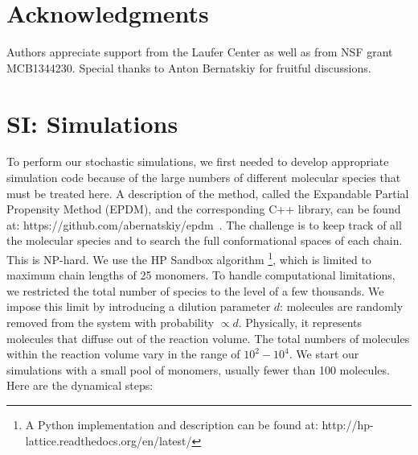 \documentclass[twocolumn,letterpaper]{revtex4-1}
\begin{document}
\section*{Acknowledgments}
Authors appreciate support from the Laufer Center as well as from NSF grant MCB1344230. Special 
thanks to Anton Bernatskiy for fruitful discussions.



\newpage
\appendix
 \section*{SI: Simulations}
To perform our stochastic simulations, we first needed to develop appropriate simulation code 
because of the large numbers of different molecular species that must be treated here.  A 
description of the method, called the Expandable Partial Propensity Method (EPDM), and the 
corresponding C++ library, can be found at: 
https://github.com/abernatskiy/epdm~\cite{Guseva2016b}. 
The challenge is to keep track of all the molecular species and to search the full conformational 
spaces of each 
chain.  This is NP-hard.  We use the HP Sandbox algorithm\cite{lau1989lattice,Dill2008a} 
\footnote{A 
Python implementation and description can be found at: 
http://hp-lattice.readthedocs.org/en/latest/}, which is limited to maximum chain lengths of 25 
monomers.  To handle computational limitations, we restricted the total number of species to the 
level of a few thousands.  We impose this limit by introducing a dilution parameter $d$: molecules 
are randomly removed from the system with probability $\propto d$.  Physically, it represents 
molecules that diffuse out of the reaction volume.  The total numbers of molecules within the 
reaction volume vary in the range of $10^2-10^4$.  We start our simulations with a small pool of 
monomers, usually fewer than 100 molecules.  Here are the dynamical steps:
\end{document}
